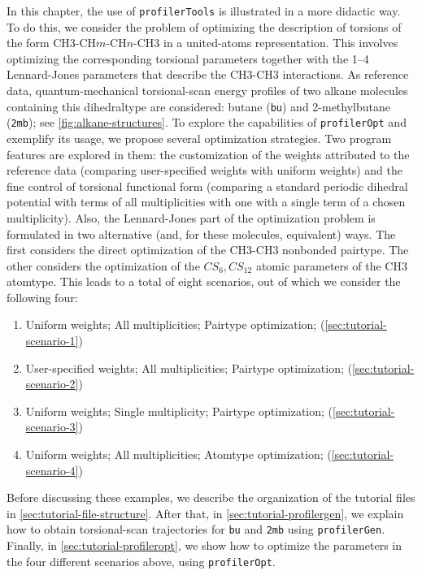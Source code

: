 \documentclass[10pt,a4paper,openany]{memoir}
\numberwithin{equation}{section}
\newcommand{\profileropt}[0]{\texttt{profilerOpt}}
\newcommand{\profilergen}[0]{\texttt{profilerGen}}
\newcommand{\profilertools}[0]{\texttt{profilerTools}}
\begin{document}
In this chapter, the use of \profilertools{} is illustrated in a more
didactic way.
%
To do this, we consider the problem of optimizing the description of
torsions of the form CH3-CH$m$-CH$n$-CH3 in a united-atoms
representation.
%
This involves optimizing the corresponding torsional parameters
together with the 1--4 Lennard-Jones parameters that describe the
CH3-CH3 interactions.
%
As reference data, quantum-mechanical torsional-scan energy profiles
of two alkane molecules containing this dihedraltype are considered:
butane (\texttt{bu}) and 2-methylbutane (\texttt{2mb}); see
\autoref{fig:alkane-structures}.
%
To explore the capabilities of \profileropt{} and exemplify its usage,
we propose several optimization strategies.
%
Two program features are explored in them:
%
the customization of the weights attributed to the reference data
(comparing user-specified weights with uniform weights) and the fine
control of torsional functional form (comparing a standard periodic
dihedral potential with terms of all multiplicities with one with a
single term of a chosen multiplicity).
%
Also, the Lennard-Jones part of the optimization problem is formulated
in two alternative (and, for these molecules, equivalent) ways.
%
The first considers the direct optimization of the CH3-CH3 nonbonded
pairtype.
%
The other considers the optimization of the $CS_6,CS_{12}$ atomic
parameters of the CH3 atomtype.
%
This leads to a total of eight scenarios, out of which we consider the
following four:
%
\begin{enumerate}
\item Uniform weights; All multiplicities; Pairtype optimization;
  (\autoref{sec:tutorial-scenario-1})
\item User-specified weights; All multiplicities; Pairtype
  optimization; (\autoref{sec:tutorial-scenario-2})
\item Uniform weights; Single multiplicity; Pairtype optimization;
  (\autoref{sec:tutorial-scenario-3})
\item Uniform weights; All multiplicities; Atomtype optimization;
  (\autoref{sec:tutorial-scenario-4})
\end{enumerate}
%
Before discussing these examples, we describe the organization of the
tutorial files in \autoref{sec:tutorial-file-structure}.  After that,
in \autoref{sec:tutorial-profilergen}, we explain how to obtain
torsional-scan trajectories for \texttt{bu} and \texttt{2mb} using
\profilergen{}. Finally, in \autoref{sec:tutorial-profileropt}, we
show how to optimize the parameters in the four different scenarios
above, using \profileropt{}.
\end{document}
